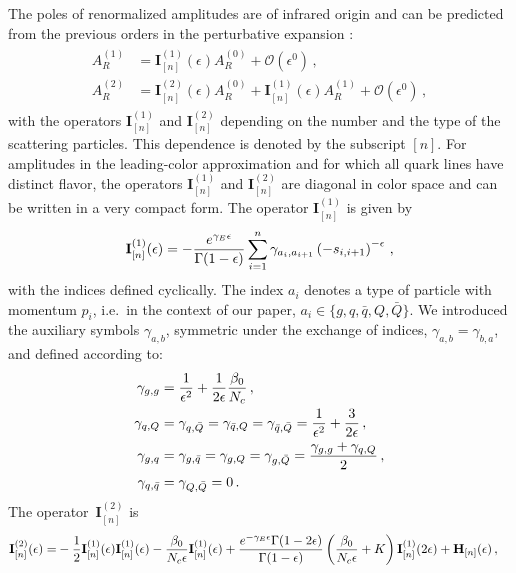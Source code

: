 The poles of renormalized amplitudes are of infrared origin and
can be predicted from the previous orders in the perturbative 
expansion 
\cite{Catani:1998bh,Sterman:2002qn,Becher:2009cu,Gardi:2009qi}:
\begin{align}
  \begin{split}\label{eq:catani}
    A_R^{(1)}&=\mathbf{I}^{(1)}_{[n]}(\epsilon)
    A_R^{(0)}+\mathcal{O}
    (\epsilon^0)\,,\\
    A_R^{(2)}&=\mathbf{I}^{(2)}_{[n]}(\epsilon)A_R^{(0)}+\mathbf{I}^{(1)}_{[n]}(\epsilon)
    A_R^{(1)}+\mathcal{O}(\epsilon^0)\,,
  \end{split}
\end{align}
with the operators $\mathbf{I}^{(1)}_{[n]}$ and
$\mathbf{I}^{(2)}_{[n]}$ depending on the number and the type of
the scattering particles. This dependence is denoted by the 
subscript $[n]$.
For amplitudes in the leading-color approximation and for which
all quark lines have distinct flavor, the operators
$\mathbf{I}^{(1)}_{[n]}$ and $\mathbf{I}^{(2)}_{[n]}$ are 
diagonal in color space and can be written in a very compact
form. The operator $\mathbf{I}^{(1)}_{[n]}$ is given by
%
\begin{equation}
  \mathbf{I}^{(1)}_{[n]}(\epsilon)=-\frac{e^{\gamma_E\epsilon}}{\Gamma(1-\epsilon)}
  \sum_{i=1}^n\gamma_{a_i,a_{i+1}}
  \left( -s_{i,i+1}\right)^{-\epsilon}\,,
\end{equation}
with the indices defined cyclically.
The index $a_i$ denotes a type of particle with momentum $p_i$, i.e.\  in the context of our paper,
$a_i\in\{g,q,\bar q, Q, \bar Q\}$. We introduced the auxiliary symbols $\gamma_{a,b}$, 
symmetric under the exchange of indices, 
$\gamma_{a,b}=\gamma_{b,a}$, and defined according to:
\begin{align}
  \begin{split}
    \gamma_{g,g}&=\frac{1}{\epsilon^2}+\frac{1}{2\epsilon}
    \frac{\beta_0}{{N_c}}\,, \\
    \gamma_{q,Q}&=\gamma_{q,\bar Q}=
    \gamma_{\bar q, Q}=\gamma_{\bar q, \bar Q} 
    =\frac{1}{\epsilon^2}+\frac{3}{2\epsilon}\,,\\
    \gamma_{g,q}&=\gamma_{g,\bar q}=
    \gamma_{g,Q}=\gamma_{g,\bar Q}=
    \frac{\gamma_{g,g}+\gamma_{q,Q}}{2}\,,\\
    \gamma_{q,\bar q}&=\gamma_{Q,\bar Q}=0\,.
  \end{split}
\end{align}
The operator~$\mathbf{I}^{(2)}_{[n]}$ is
\begin{align}
  \label{eqn:Iop}
  \begin{split} 
    \mathbf{I}^{(2)}_{[n]}(\epsilon)=&
    -\frac{1}{2}\mathbf{I}^{(1)}_{[n]}(\epsilon)\mathbf{I}^{(1)}_{[n]}(\epsilon)
    -\frac{\beta_0}{{N_c}\epsilon}\mathbf{I}^{(1)}_{[n]}(\epsilon) + 
    \frac{e^{-\gamma_E\epsilon}\Gamma(1-2\epsilon)}
    {\Gamma(1-\epsilon)}
    \left(\frac{\beta_0}{{N_c}\epsilon}+K\right)
    \mathbf{I}^{(1)}_{[n]}(2\epsilon) + 
    \mathbf{H}_{[n]}(\epsilon)\,,
  \end{split}
\end{align}

